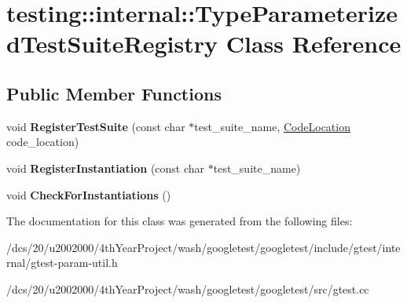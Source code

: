 \hypertarget{classtesting_1_1internal_1_1TypeParameterizedTestSuiteRegistry}{}\section{testing\+:\+:internal\+:\+:Type\+Parameterized\+Test\+Suite\+Registry Class Reference}
\label{classtesting_1_1internal_1_1TypeParameterizedTestSuiteRegistry}
\subsection*{Public Member Functions}
\begin{DoxyCompactItemize}
\item 
\mbox{\label{classtesting_1_1internal_1_1TypeParameterizedTestSuiteRegistry_a8a41503ac32be0f634583a2e7ee1159a}} 
void {\bfseries Register\+Test\+Suite} (const char $\ast$test\+\_\+suite\+\_\+name, \mbox{\hyperlink{structtesting_1_1internal_1_1CodeLocation}{Code\+Location}} code\+\_\+location)
\item 
\mbox{\label{classtesting_1_1internal_1_1TypeParameterizedTestSuiteRegistry_ad6413d7c6df0b08e54aa1bbd166fc949}} 
void {\bfseries Register\+Instantiation} (const char $\ast$test\+\_\+suite\+\_\+name)
\item 
\mbox{\label{classtesting_1_1internal_1_1TypeParameterizedTestSuiteRegistry_ad3b086596f2a84f3344fe1558126afbb}} 
void {\bfseries Check\+For\+Instantiations} ()
\end{DoxyCompactItemize}


The documentation for this class was generated from the following files\+:\begin{DoxyCompactItemize}
\item 
/dcs/20/u2002000/4th\+Year\+Project/wash/googletest/googletest/include/gtest/internal/gtest-\/param-\/util.\+h\item 
/dcs/20/u2002000/4th\+Year\+Project/wash/googletest/googletest/src/gtest.\+cc\end{DoxyCompactItemize}
